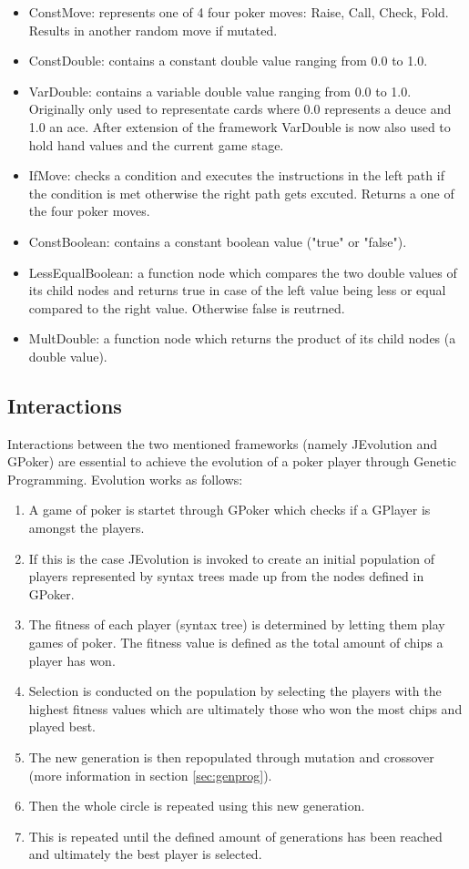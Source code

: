 \documentclass[12pt,fleqn,a4paper]{article}
\begin{document}
\begin{itemize}
	\item ConstMove: represents one of 4 four poker moves: Raise, Call, Check, Fold. Results in another random
	move if mutated.
	\item ConstDouble: contains a constant double value ranging from 0.0 to 1.0.
	\item VarDouble: contains a variable double value ranging from 0.0 to 1.0. Originally only used to representate
	cards where 0.0 represents a deuce and 1.0 an ace. After extension of the framework VarDouble is now also used to
	hold hand values and the current game stage.
	\item IfMove: checks a condition and executes the instructions in the left path if the condition is met otherwise the 
	right path gets excuted. Returns a one of the four poker moves.
	\item ConstBoolean: contains a constant boolean value ("true" or "false").
	\item LessEqualBoolean: a function node which compares the two double values of its child nodes and returns true in case of the left value being less or equal compared to the right value. Otherwise false is reutrned.
	\item MultDouble: a function node which returns the product of its child nodes (a double value).
\end{itemize}

\subsection{Interactions}
Interactions between the two mentioned frameworks (namely JEvolution and GPoker) are essential to achieve the evolution of a poker player through Genetic Programming. Evolution works as follows:
\label{sec:nodes}
\begin{enumerate}
	\item A game of poker is startet through GPoker which checks if a GPlayer is amongst the players.
	\item If this is the case JEvolution is invoked to create an initial population of players represented by syntax trees
	made up from the nodes defined in GPoker.
	\item The fitness of each player (syntax tree) is determined by letting them play games of poker. The fitness value is defined as the total amount of chips a player has won.
	\item Selection is conducted on the population by selecting the players with the highest fitness values which are ultimately those who won the most chips and played best.
	\item The new generation is then repopulated through mutation and crossover (more information in section \ref{sec:genprog}).
	\item Then the whole circle is repeated using this new generation.
	\item This is repeated until the defined amount of generations has been reached and ultimately the best player is selected.
\end{enumerate}
\end{document}
